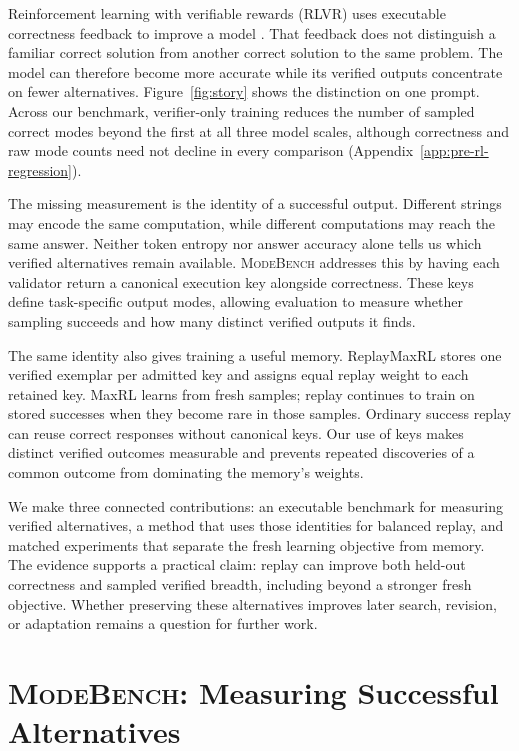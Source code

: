 \documentclass{article}
\newcommand{\1}{\mathbf 1}
\newcommand{\mb}{\textsc{ModeBench}}
\theoremstyle{remark}
\theoremstyle{definition}
\theoremstyle{plain}
\begin{document}
Reinforcement learning with verifiable rewards (RLVR) uses executable
correctness feedback to improve a model \citep{guo2025deepseekr1}. That feedback
does not distinguish a familiar correct solution from another correct solution
to the same problem. The model can therefore become more accurate while its
verified outputs concentrate on fewer alternatives. Figure~\ref{fig:story}
shows the distinction on one prompt. Across our benchmark, verifier-only
training reduces the number of sampled correct modes beyond the first at all
three model scales, although correctness and raw mode counts need not decline
in every comparison (Appendix~\ref{app:pre-rl-regression}).

The missing measurement is the identity of a successful output. Different
strings may encode the same computation, while different computations may
reach the same answer. Neither token entropy nor answer accuracy alone tells
us which verified alternatives remain available. \mb{} addresses this by
having each validator return a canonical execution key alongside correctness.
These keys define task-specific output modes, allowing evaluation to measure whether sampling succeeds and how many
distinct verified outputs it finds.

The same identity also gives training a useful memory. ReplayMaxRL stores one
verified exemplar per admitted key and assigns equal replay weight to each
retained key. MaxRL learns from fresh samples; replay continues to train on
stored successes when they become rare in those samples. Ordinary success
replay can reuse correct responses without canonical keys. Our use of keys
makes distinct verified outcomes measurable and prevents repeated discoveries
of a common outcome from dominating the memory's weights.

We make three connected contributions: an executable benchmark for measuring
verified alternatives, a method that uses those identities for balanced replay,
and matched experiments that separate the fresh learning objective from memory.
The evidence supports a practical claim: replay can improve both held-out
correctness and sampled verified breadth, including beyond a stronger fresh
objective. Whether preserving these alternatives improves later search, revision, or
adaptation remains a question for further work.

\section{\mb: Measuring Successful Alternatives}
\label{sec:modebench}
\label{sec:collapse}
\end{document}
